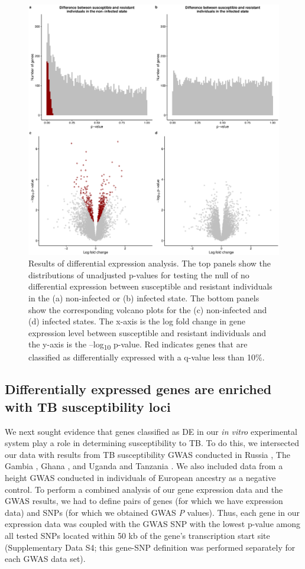 \documentclass[fleqn,10pt]{wlscirep}
\begin{document}
\begin{figure}[p]
\centering
\includegraphics[width=\linewidth]{../figure/limma.eps}
\caption{
Results of differential expression analysis. The top panels show the
distributions of unadjusted p-values for testing the null of no
differential expression between susceptible and resistant individuals
in the (a) non-infected or (b) infected state. The bottom panels show
the corresponding volcano plots for the (c) non-infected and (d)
infected states. The x-axis is the log fold change in gene expression
level between susceptible and resistant individuals and the y-axis is
the –log\textsubscript{10} p-value. Red indicates genes that are
classified as differentially expressed with a q-value less than 10\%.
}
\label{fig:limma}
\end{figure}
\subsection*{Differentially expressed genes are enriched with TB susceptibility loci}

We next sought evidence that genes classified as DE in our \emph{in
vitro} experimental system play a role in determining susceptibility
to TB. To do this, we intersected our data with results from TB
susceptibility GWAS conducted in Russia \cite{Curtis2015}, The Gambia
\cite{Thye2010}, Ghana \cite{Thye2010}, and Uganda and Tanzania
\cite{Sobota2016}. We also included data from a height GWAS conducted
in individuals of European ancestry \cite{LangoAllen2010} as a
negative control. To perform a combined analysis of our gene
expression data and the GWAS results, we had to define pairs of genes
(for which we have expression data) and SNPs (for which we obtained
GWAS \emph{P} values). Thus, each gene in our expression data was
coupled with the GWAS SNP with the lowest p-value among all tested
SNPs located within 50 kb of the gene’s transcription start site
(Supplementary Data S4; this gene-SNP definition was performed
separately for each GWAS data set).
\end{document}
